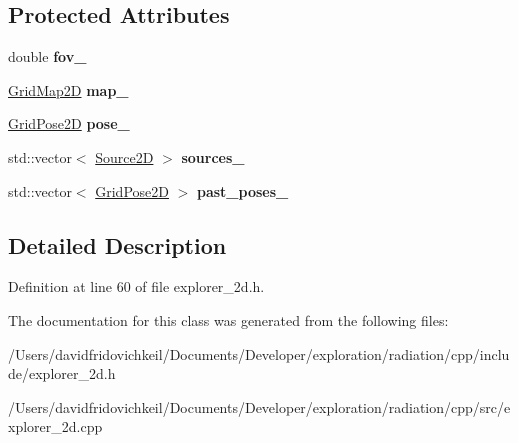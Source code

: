 \subsection*{Protected Attributes}
\begin{DoxyCompactItemize}
\item 
\hypertarget{classradiation_1_1_explorer2_d_a67746d1bf33ea4a0f9d5794e490a9d40}{}\label{classradiation_1_1_explorer2_d_a67746d1bf33ea4a0f9d5794e490a9d40} 
double {\bfseries fov\+\_\+}
\item 
\hypertarget{classradiation_1_1_explorer2_d_ad9d295085a98c134f54fc2acf9f6c3b9}{}\label{classradiation_1_1_explorer2_d_ad9d295085a98c134f54fc2acf9f6c3b9} 
\hyperlink{classradiation_1_1_grid_map2_d}{Grid\+Map2D} {\bfseries map\+\_\+}
\item 
\hypertarget{classradiation_1_1_explorer2_d_ad178dd47cb8778f1c99a7a600d5ca625}{}\label{classradiation_1_1_explorer2_d_ad178dd47cb8778f1c99a7a600d5ca625} 
\hyperlink{classradiation_1_1_grid_pose2_d}{Grid\+Pose2D} {\bfseries pose\+\_\+}
\item 
\hypertarget{classradiation_1_1_explorer2_d_a89003d6709bf9d0f5b09bc561e1d50ce}{}\label{classradiation_1_1_explorer2_d_a89003d6709bf9d0f5b09bc561e1d50ce} 
std\+::vector$<$ \hyperlink{classradiation_1_1_source2_d}{Source2D} $>$ {\bfseries sources\+\_\+}
\item 
\hypertarget{classradiation_1_1_explorer2_d_ae221c334df98e0676a49ab678124749e}{}\label{classradiation_1_1_explorer2_d_ae221c334df98e0676a49ab678124749e} 
std\+::vector$<$ \hyperlink{classradiation_1_1_grid_pose2_d}{Grid\+Pose2D} $>$ {\bfseries past\+\_\+poses\+\_\+}
\end{DoxyCompactItemize}


\subsection{Detailed Description}


Definition at line 60 of file explorer\+\_\+2d.\+h.



The documentation for this class was generated from the following files\+:\begin{DoxyCompactItemize}
\item 
/\+Users/davidfridovichkeil/\+Documents/\+Developer/exploration/radiation/cpp/include/explorer\+\_\+2d.\+h\item 
/\+Users/davidfridovichkeil/\+Documents/\+Developer/exploration/radiation/cpp/src/explorer\+\_\+2d.\+cpp\end{DoxyCompactItemize}
